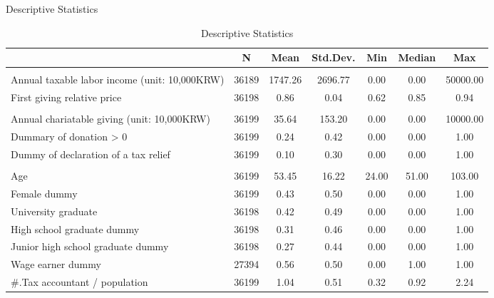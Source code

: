 \documentclass[
  ignorenonframetext,
  aspectratio=169,
]{beamer}
\begin{document}
\begin{frame}{Descriptive Statistics}
\protect\hypertarget{descriptive-statistics}{}
\begin{table}

\caption{\label{tab:SummaryCovariate}Descriptive Statistics}
\centering
\fontsize{6}{8}\selectfont
\begin{tabular}[t]{lcccccc}
\toprule
  & N & Mean & Std.Dev. & Min & Median & Max\\
\midrule
\addlinespace[0.3em]
\multicolumn{7}{l}{\textbf{Income and giving price}}\\
\hspace{1em}Annual taxable labor income (unit: 10,000KRW) & 36189 & 1747.26 & 2696.77 & 0.00 & 0.00 & 50000.00\\
\hspace{1em}First giving relative price & 36198 & 0.86 & 0.04 & 0.62 & 0.85 & 0.94\\
\addlinespace[0.3em]
\multicolumn{7}{l}{\textbf{Charitable giving}}\\
\hspace{1em}Annual chariatable giving (unit: 10,000KRW) & 36199 & 35.64 & 153.20 & 0.00 & 0.00 & 10000.00\\
\hspace{1em}Dummary of donation > 0 & 36199 & 0.24 & 0.42 & 0.00 & 0.00 & 1.00\\
\hspace{1em}Dummy of declaration of a tax relief & 36199 & 0.10 & 0.30 & 0.00 & 0.00 & 1.00\\
\addlinespace[0.3em]
\multicolumn{7}{l}{\textbf{Individual Characteristics}}\\
\hspace{1em}Age & 36199 & 53.45 & 16.22 & 24.00 & 51.00 & 103.00\\
\hspace{1em}Female dummy & 36199 & 0.43 & 0.50 & 0.00 & 0.00 & 1.00\\
\hspace{1em}University graduate & 36198 & 0.42 & 0.49 & 0.00 & 0.00 & 1.00\\
\hspace{1em}High school graduate dummy & 36198 & 0.31 & 0.46 & 0.00 & 0.00 & 1.00\\
\hspace{1em}Junior high school graduate dummy & 36198 & 0.27 & 0.44 & 0.00 & 0.00 & 1.00\\
\hspace{1em}Wage earner dummy & 27394 & 0.56 & 0.50 & 0.00 & 1.00 & 1.00\\
\hspace{1em}\#.Tax accountant / population & 36199 & 1.04 & 0.51 & 0.32 & 0.92 & 2.24\\
\bottomrule
\end{tabular}
\end{table}
\end{frame}
\end{document}
